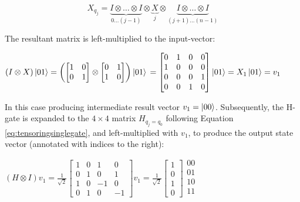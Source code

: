 \documentclass[conference]{IEEEtran}
\begin{document}
\begin{equation}
    X_{q_{j}} = \underbrace{I \otimes \dots \otimes I}_{0 \dots (j-1)} \otimes \underbrace{X}_{j} \otimes \underbrace{I \otimes \dots \otimes I}_{(j+1) \dots (n-1)} \tag{6.3} \label{eq:tensoringsinglegate}
\end{equation}

The resultant matrix is left-multiplied to the input-vector:
\begin{center}
$
\left(I \otimes X\right)\ket{01}
=
\left(
\begin{bmatrix}
    1 & 0 \\
    0 & 1
\end{bmatrix}
\otimes
\begin{bmatrix}
    0 & 1 \\
    1 & 0
\end{bmatrix}
\right)
\ket{01} \newline
=
\begin{bmatrix}
    0 & 1 & 0 & 0 \\
    1 & 0 & 0 & 0 \\
    0 & 0 & 0 & 1 \\
    0 & 0 & 1 & 0
\end{bmatrix}
\ket{01}
=
X_{1} \ket{01}
= v_{1}
$
\end{center}

In this case producing intermediate result vector $v_{1}=\ket{00}$.
Subsequently, the H-gate is expanded to the $4\times 4$ matrix $H_{q_j=q_0}$ following
Equation \ref{eq:tensoringsinglegate}, and left-multiplied with $v_{1}$,
to produce the output state vector (annotated with indices to the right):
\begin{center}
$\left(H \otimes I\right)v_{1}
=
\frac{1}{\sqrt{2}}
\begin{bmatrix}
    1 & 0 & 1 & 0 \\
    0 & 1 & 0 & 1 \\
    1 & 0 & -1 & 0 \\
    0 & 1 & 0 & -1
\end{bmatrix}
v_{1}
=
\frac{1}{\sqrt{2}}
\begin{bmatrix}
    1 \\
    0 \\
    1 \\
    0
\end{bmatrix}
\begin{matrix}
{\scriptstyle 00} \\
{\scriptstyle 01} \\
{\scriptstyle 10} \\
{\scriptstyle 11} \\
\end{matrix}
$
\end{center}
\end{document}
